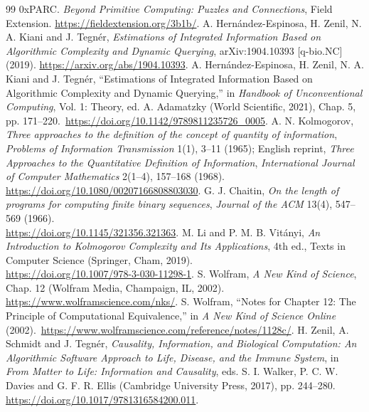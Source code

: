 \documentclass[11pt,a4paper]{article}
\begin{document}
\begin{thebibliography}{99}
 0xPARC. \emph{Beyond Primitive Computing: Puzzles and Connections}, Field Extension.
\url{https://fieldextension.org/3b1b/}.
 A. Hernández-Espinosa, H. Zenil, N. A. Kiani and
J. Tegnér, \emph{Estimations of Integrated Information Based on Algorithmic
Complexity and Dynamic Querying}, arXiv:1904.10393 [q-bio.NC] (2019).
\url{https://arxiv.org/abs/1904.10393}.
 A. Hernández-Espinosa, H. Zenil, N. A. Kiani and
J. Tegnér, ``Estimations of Integrated Information Based on Algorithmic
Complexity and Dynamic Querying,'' in \emph{Handbook of Unconventional
Computing}, Vol. 1: Theory, ed. A. Adamatzky (World Scientific, 2021), Chap. 5,
pp. 171--220.\ \url{https://doi.org/10.1142/9789811235726_0005}.
 A. N. Kolmogorov, \emph{Three approaches to the
definition of the concept of quantity of information}, \emph{Problems of
Information Transmission} 1(1), 3--11 (1965); English reprint,
\emph{Three Approaches to the Quantitative Definition of Information},
\emph{International Journal of Computer Mathematics} 2(1--4), 157--168
(1968).\\ \url{https://doi.org/10.1080/00207166808803030}.
 G. J. Chaitin, \emph{On the length of programs for
computing finite binary sequences}, \emph{Journal of the ACM} 13(4),
547--569 (1966).\\ \url{https://doi.org/10.1145/321356.321363}.
 M. Li and P. M. B. Vitányi, \emph{An Introduction to
Kolmogorov Complexity and Its Applications}, 4th ed., Texts in Computer
Science (Springer, Cham, 2019).\\ \url{https://doi.org/10.1007/978-3-030-11298-1}.
 S. Wolfram, \emph{A New Kind of Science}, Chap. 12
(Wolfram Media, Champaign, IL, 2002).\\
\url{https://www.wolframscience.com/nks/}.
 S. Wolfram, ``Notes for Chapter 12: The Principle
of Computational Equivalence,'' in \emph{A New Kind of Science Online}
(2002).\ \url{https://www.wolframscience.com/reference/notes/1128c/}.
 H. Zenil, A. Schmidt and J. Tegnér,
\emph{Causality, Information, and Biological Computation: An Algorithmic
Software Approach to Life, Disease, and the Immune System}, in \emph{From
Matter to Life: Information and Causality}, eds. S. I. Walker, P. C. W. Davies
and G. F. R. Ellis (Cambridge University Press, 2017), pp. 244--280.
\url{https://doi.org/10.1017/9781316584200.011}.

\end{thebibliography}
\end{document}
